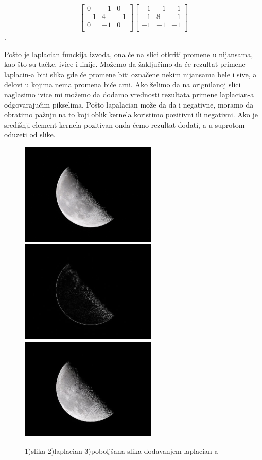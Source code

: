 \documentclass[a4paper,12pt,titlepage]{article}
\begin{document}
\[
\begin{bmatrix}
     0 & -1 & 0 \\
     -1 & 4 & -1 \\
     0 & -1 & 0 \\
\end{bmatrix}
\begin{bmatrix}
     -1 & -1 & -1 \\
     -1 & 8 & -1 \\
     -1 & -1 & -1 \\
\end{bmatrix}
\]. 

Pošto je laplacian funckija izvoda, ona će na slici otkriti promene u nijansama, kao što su tačke, ivice i linije. Možemo da žaključimo da će rezultat primene laplacin-a biti slika gde će promene biti označene nekim nijansama bele i sive, a delovi u kojima nema promena biće crni. Ako želimo da na orignilanoj slici naglasimo ivice mi možemo da dodamo vrednosti rezultata primene laplacian-a odgovarajućim pikselima. Pošto lapalacian može da da i negativne, moramo da obratimo pažnju na to koji oblik kernela koristimo pozitivni ili negativni. Ako je središnji element kernela pozitivan onda ćemo rezultat dodati, a u suprotom oduzeti od slike.

\begin{figure}[ht!]
\centering
\includegraphics[width=65mm]{img/moon.jpg}
\includegraphics[width=65mm]{img/moonLap.jpg}
\includegraphics[width=65mm]{img/moonEn.jpg}
\caption{1)slika 2)laplacian 3)poboljšana slika dodavanjem laplacian-a}
\label{overflow}
\end{figure}
\end{document}
